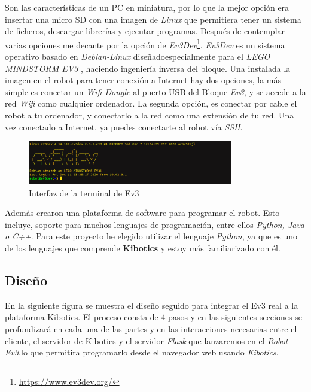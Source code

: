 Son las características de un PC en miniatura, por lo que la mejor opción era insertar una micro SD con una imagen de \textit{Linux} que permitiera tener un sistema de ficheros, descargar librerías y ejecutar programas. Después de contemplar varias opciones me decante por la opción de \textit{Ev3Dev}\footnote{\url{https://www.ev3dev.org/}}.\newline
\textit{Ev3Dev} es un sistema operativo basado en \textit{Debian-Linux} diseñadoespecialmente para el \textit{LEGO MINDSTORM EV3} , haciendo ingeniería inversa del bloque.\newline
Una instalada la imagen en el robot para tener conexión a Internet hay dos opciones, la más simple es conectar un \textit{Wifi Dongle} al puerto USB del Bloque \textit{Ev3}, y se accede a la red \textit{Wifi} como cualquier ordenador. La segunda opción, es conectar por cable el robot a tu ordenador, y conectarlo a la red como una extensión de tu red.\newline
Una vez conectado a Internet, ya puedes conectarte al robot vía \textit{SSH}.

\begin{figure}[h!]
  \centering
    \includegraphics[width=0.8\textwidth]{img/ev3dev.png}
  \caption{Interfaz de la terminal de Ev3}
  \label{Diseño hardware del Ev3}
\end{figure}
Además crearon una plataforma de software para programar el robot. Esto incluye, soporte para muchos lenguajes de programación, entre ellos \textit{Python, Java o C++}. Para este proyecto he elegido utilizar el lenguaje \textit{Python}, ya que es uno de los lenguajes que comprende \textbf{Kibotics} y estoy más familiarizado con él. 

\subsection{Diseño}
En la siguiente figura se muestra el diseño seguido para integrar el Ev3 real a la plataforma Kibotics. El proceso consta de 4 pasos y en las siguientes secciones se profundizará en cada una de las partes y en las interacciones necesarias entre el cliente, el servidor de Kibotics y el servidor \textit{Flask} que lanzaremos en el \textit{Robot Ev3},lo que permitira programarlo desde el navegador web usando  \textit{Kibotics}.

